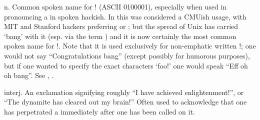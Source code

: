 
\begin{inparaenum}
    \item n. Common spoken name for ! (ASCII 0100001), especially when used in
        pronouncing a  in spoken hackish. In
         this was considered a CMUish usage, with MIT and
        Stanford hackers preferring  or ; but
        the spread of Unix has carried `bang' with it (esp. via the term
        ) and it is now certainly the most common spoken
        name for !. Note that it is used exclusively for non-emphatic written !;
        one would not say ``Congratulations bang'' (except possibly for humorous
        purposes), but if one wanted to specify the exact characters `foo!' one
        would speak ``Eff oh oh bang''. See ,
        .
    \item interj. An exclamation signifying roughly ``I have achieved
        enlightenment!'', or ``The dynamite has cleared out my brain!'' Often
        used to acknowledge that one has perpetrated a 
        immediately after one has been called on it.
\end{inparaenum}

